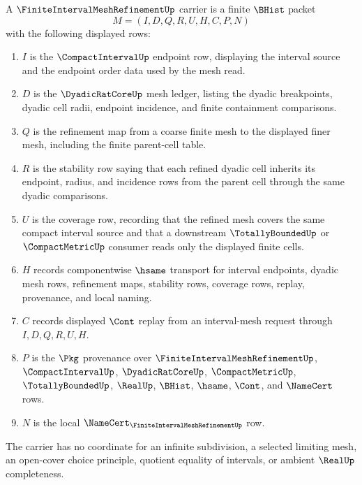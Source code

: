 \begin{definition}
\label{def:finite-interval-mesh-refinement-packet}
A $\FiniteIntervalMeshRefinementUp$ carrier is a finite $\BHist$ packet
$$
M=(I,D,Q,R,U,H,C,P,N)
$$
with the following displayed rows:
\begin{enumerate}
\item $I$ is the $\CompactIntervalUp$ endpoint row, displaying the interval source and the endpoint order data used by the mesh read.
\item $D$ is the $\DyadicRatCoreUp$ mesh ledger, listing the dyadic breakpoints, dyadic cell radii, endpoint incidence, and finite containment comparisons.
\item $Q$ is the refinement map from a coarse finite mesh to the displayed finer mesh, including the finite parent-cell table.
\item $R$ is the stability row saying that each refined dyadic cell inherits its endpoint, radius, and incidence rows from the parent cell through the same dyadic comparisons.
\item $U$ is the coverage row, recording that the refined mesh covers the same compact interval source and that a downstream $\TotallyBoundedUp$ or $\CompactMetricUp$ consumer reads only the displayed finite cells.
\item $H$ records componentwise $\hsame$ transport for interval endpoints, dyadic mesh rows, refinement maps, stability rows, coverage rows, replay, provenance, and local naming.
\item $C$ records displayed $\Cont$ replay from an interval-mesh request through $I,D,Q,R,U,H$.
\item $P$ is the $\Pkg$ provenance over $\FiniteIntervalMeshRefinementUp$, $\CompactIntervalUp$, $\DyadicRatCoreUp$, $\CompactMetricUp$, $\TotallyBoundedUp$, $\RealUp$, $\BHist$, $\hsame$, $\Cont$, and $\NameCert$ rows.
\item $N$ is the local $\NameCert_{\FiniteIntervalMeshRefinementUp}$ row.
\end{enumerate}
The carrier has no coordinate for an infinite subdivision, a selected limiting mesh, an open-cover choice principle, quotient equality of intervals, or ambient $\RealUp$ completeness.
\end{definition}

